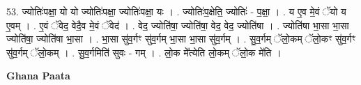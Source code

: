 \documentclass[17pt]{extarticle}
\begin{document}
53. ज्योतिः॑पक्षा॒ यो यो ज्योतिः॑पक्षा॒ ज्योतिः॑पक्षा॒ यः । . ज्योतिः॑प॒क्षेति॒ ज्योतिः॑ - प॒क्षा॒ । . य ए॒व मे॒वं ॅयो य ए॒वम् । . ए॒वं ॅवेद॒ वेदै॒व मे॒वं ॅवेद॑ । . वेद॒ ज्योति॑षा॒ ज्योति॑षा॒ वेद॒ वेद॒ ज्योति॑षा । . ज्योति॑षा भा॒सा भा॒सा ज्योति॑षा॒ ज्योति॑षा भा॒सा । . भा॒सा सु॑व॒र्गꣳ सु॑व॒र्गम् भा॒सा भा॒सा सु॑व॒र्गम् । . सु॒व॒र्गम् ॅलो॒कम् ॅलो॒कꣳ सु॑व॒र्गꣳ सु॑व॒र्गम् ॅलो॒कम् । . सु॒व॒र्गमिति॑ सुवः - गम् । . लो॒क मे᳚त्येति लो॒कम् ॅलो॒क मे॑ति । \newline

\textbf{Ghana Paata } \newline
\end{document}
